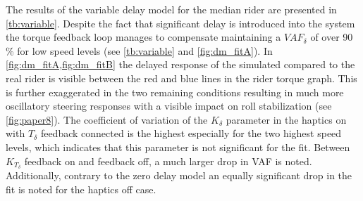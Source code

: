The results of the variable delay model for the median rider are presented in \cref{tb:variable}.  Despite the fact that significant delay is introduced into the system the torque feedback loop manages to compensate maintaining a \ensuremath{\mathit{VAF}_\delta} of over 90 \% for low speed levels (see \cref{tb:variable} and \cref{fig:dm_fitA}). In \cref{fig:dm_fitA,fig:dm_fitB} the delayed response of the simulated compared to the real rider is visible between the red and blue lines in the rider torque graph. This is further exaggerated in the two remaining conditions resulting in much more oscillatory steering responses with a visible impact on roll stabilization (see \cref{fig:paper8}). The coefficient of variation of the \ensuremath{K_\delta} parameter in the haptics on with \ensuremath{T_\delta} feedback connected is the highest especially for the two highest speed levels, which indicates that this parameter is not significant for the fit. Between \ensuremath{K_{T_\delta}} feedback on and feedback off, a much larger drop in VAF is noted. Additionally, contrary to the zero delay model an equally significant drop in the fit is noted for the haptics off case. 






